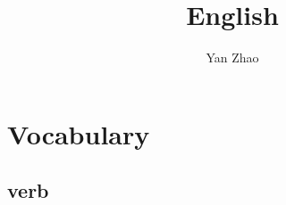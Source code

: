\documentclass[a4paper,11pt,twoside]{book}
\begin{document}
\title{English}
\author{Yan Zhao}
\date{}\maketitle

\setcounter{secnumdepth}{4}
\setcounter{tocdepth}{4}
\tableofcontents
\setcounter{page}{1}


\setlength\parindent{0pt}
\setlength{\parskip}{5pt}


\chapter{Vocabulary}
\section{verb}
\end{document}
